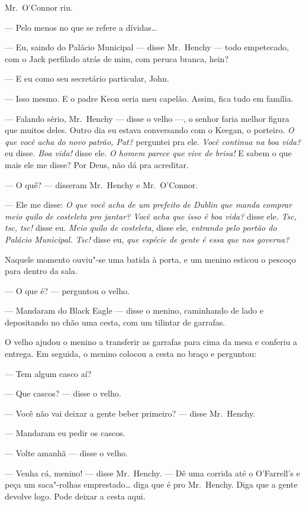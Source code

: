 Mr.~O’Connor riu.

--- Pelo menos no que se refere a dívidas\ldots{}

--- Eu, saindo do Palácio Municipal --- disse Mr.~Henchy --- todo empetecado,
com o Jack perfilado atrás de mim, com peruca branca, hein?

--- E eu como seu secretário particular, John.

--- Isso mesmo.  E o padre Keon seria meu capelão.  Assim, fica tudo em
família.

--- Falando sério, Mr.~Henchy --- disse o velho ---, o senhor faria melhor
figura que muitos deles.  Outro dia eu estava conversando com o Keegan, o
porteiro.  \textit{O que você acha do novo patrão, Pat?} perguntei pra ele.
\textit{Você continua na boa vida?} eu disse.  \textit{Boa vida!} disse ele.
\textit{O homem parece que vive de brisa!} E sabem o que mais ele me
disse? Por Deus, não dá pra acreditar.

--- O quê? --- disseram Mr.~Henchy e Mr.~O’Connor.

--- Ele me disse: \textit{O que você acha de um prefeito de Dublin que
manda comprar meio quilo de costeleta pro jantar?  Você acha que isso
é boa vida?} disse ele.  \textit{Tsc, tsc, tsc!} disse eu.  \textit{Meio quilo
de costeleta}, disse ele, \textit{entrando pelo portão do Palácio
Municipal.  Tsc!} disse eu, \textit{que espécie de gente é essa que nos
governa?}

Naquele momento ouviu"-se uma batida à porta, e um menino esticou o pescoço para
dentro da sala.

--- O que é? --- perguntou o velho.

--- Mandaram do Black Eagle --- disse o menino, caminhando de lado e
depositando no chão uma cesta, com um tilintar de garrafas.

O velho ajudou o menino a transferir as garrafas para cima da mesa e conferiu a
entrega.  Em seguida, o menino colocou a cesta no braço e perguntou:

--- Tem algum casco aí?

--- Que cascos? --- disse o velho.

--- Você não vai deixar a gente beber primeiro? --- disse Mr.~Henchy.

--- Mandaram eu pedir os cascos.

--- Volte amanhã --- disse o velho.

--- Venha cá, menino! --- disse Mr.~Henchy.  --- Dê uma corrida até o
O’Farrell’s e peça um saca"-rolhas emprestado\ldots{} diga que é pro Mr.~Henchy.  
Diga que a gente devolve logo.  Pode deixar a cesta aqui.

